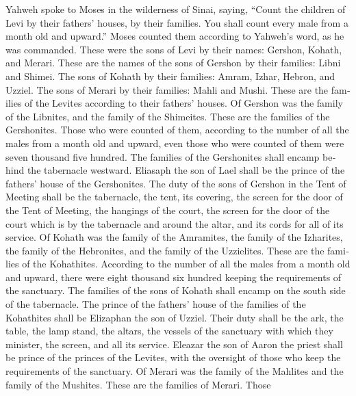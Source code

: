 \begin{paracol}{2}
\begin{otherlanguage}{english}
 Yahweh spoke to Moses in the wilderness of Sinai,
saying,  ``Count the children of Levi by their fathers'
houses, by their families. You shall count every male from a month old
and upward.''  Moses counted them according to Yahweh's
word, as he was commanded.  These were the sons of Levi
by their names: Gershon, Kohath, and Merari.  These are
the names of the sons of Gershon by their families: Libni and Shimei.
 The sons of Kohath by their families: Amram, Izhar,
Hebron, and Uzziel.  The sons of Merari by their
families: Mahli and Mushi. These are the families of the Levites
according to their fathers' houses.  Of Gershon was the
family of the Libnites, and the family of the Shimeites. These are the
families of the Gershonites.  Those who were counted of
them, according to the number of all the males from a month old and
upward, even those who were counted of them were seven thousand five
hundred.  The families of the Gershonites shall encamp
behind the tabernacle westward.  Eliasaph the son of Lael
shall be the prince of the fathers' house of the Gershonites.
 The duty of the sons of Gershon in the Tent of Meeting
shall be the tabernacle, the tent, its covering, the screen for the door
of the Tent of Meeting,  the hangings of the court, the
screen for the door of the court which is by the tabernacle and around
the altar, and its cords for all of its service.  Of
Kohath was the family of the Amramites, the family of the Izharites, the
family of the Hebronites, and the family of the Uzzielites. These are
the families of the Kohathites.  According to the number
of all the males from a month old and upward, there were eight thousand
six hundred keeping the requirements of the sanctuary. 
The families of the sons of Kohath shall encamp on the south side of the
tabernacle.  The prince of the fathers' house of the
families of the Kohathites shall be Elizaphan the son of Uzziel.
 Their duty shall be the ark, the table, the lamp stand,
the altars, the vessels of the sanctuary with which they minister, the
screen, and all its service.  Eleazar the son of Aaron
the priest shall be prince of the princes of the Levites, with the
oversight of those who keep the requirements of the sanctuary.
 Of Merari was the family of the Mahlites and the family
of the Mushites. These are the families of Merari.  Those

\end{otherlanguage}
\end{paracol}
